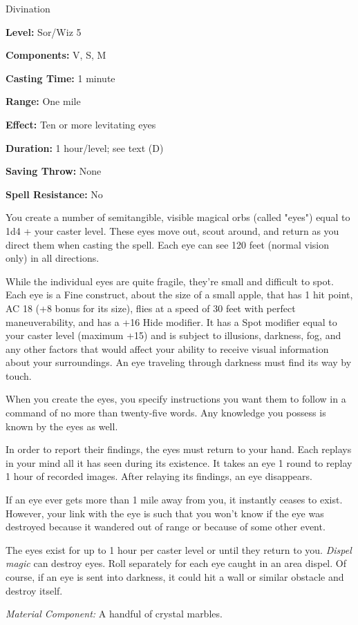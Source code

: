 
Divination

\textbf{Level:} Sor/Wiz 5

\textbf{Components:} V, S, M

\textbf{Casting Time:} 1 minute

\textbf{Range:} One mile

\textbf{Effect:} Ten or more levitating eyes

\textbf{Duration:} 1 hour/level; see text (D)

\textbf{Saving Throw:} None

\textbf{Spell Resistance:} No

You create a number of semitangible, visible magical orbs (called "eyes") equal 
to 1d4 + your caster level. These eyes move out, scout around, and return as you 
direct them when casting the spell. Each eye can see 120 feet (normal vision only) 
in all directions.

While the individual eyes are quite fragile, they're small and difficult to spot. 
Each eye is a Fine construct, about the size of a small apple, that has 1 hit point, 
AC 18 (+8 bonus for its size), flies at a speed of 30 feet with perfect maneuverability, 
and has a +16 Hide modifier. It has a Spot modifier equal to your caster level 
(maximum +15) and is subject to illusions, darkness, fog, and any other factors 
that would affect your ability to receive visual information about your surroundings. 
An eye traveling through darkness must find its way by touch.

When you create the eyes, you specify instructions you want them to follow in a 
command of no more than twenty-five words. Any knowledge you possess is known by 
the eyes as well.

In order to report their findings, the eyes must return to your hand. Each replays 
in your mind all it has seen during its existence. It takes an eye 1 round to replay 
1 hour of recorded images. After relaying its findings, an eye disappears. 

If an eye ever gets more than 1 mile away from you, it instantly ceases to exist. 
However, your link with the eye is such that you won't know if the eye was destroyed 
because it wandered out of range or because of some other event.

The eyes exist for up to 1 hour per caster level or until they return to you. \textit{Dispel 
magic} can destroy eyes. Roll separately for each eye caught in an area dispel. 
Of course, if an eye is sent into darkness, it could hit a wall or similar obstacle 
and destroy itself.

\textit{Material Component:} A handful of crystal marbles.

